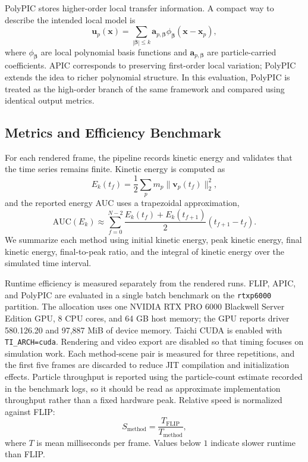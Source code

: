 \documentclass[conference]{IEEEtran}
\begin{document}
PolyPIC stores higher-order local transfer information. A compact way to describe the intended local model is
\begin{equation}
\mathbf{u}_p(\mathbf{x})
= \sum_{|\boldsymbol{\beta}|\le k}
\mathbf{a}_{p,\boldsymbol{\beta}}
\phi_{\boldsymbol{\beta}}(\mathbf{x}-\mathbf{x}_p),
\label{eq:polypic}
\end{equation}
where $\phi_{\boldsymbol{\beta}}$ are local polynomial basis functions and $\mathbf{a}_{p,\boldsymbol{\beta}}$ are particle-carried coefficients. APIC corresponds to preserving first-order local variation; PolyPIC extends the idea to richer polynomial structure. In this evaluation, PolyPIC is treated as the high-order branch of the same framework and compared using identical output metrics.

\subsection{Metrics and Efficiency Benchmark}

For each rendered frame, the pipeline records kinetic energy and validates that the time series remains finite. Kinetic energy is computed as
\begin{equation}
E_k(t_f)=\frac{1}{2}\sum_p m_p \|\mathbf{v}_p(t_f)\|_2^2,
\label{eq:energy}
\end{equation}
and the reported energy AUC uses a trapezoidal approximation,
\begin{equation}
\mathrm{AUC}(E_k)\approx
\sum_{f=0}^{N-2}
\frac{E_k(t_f)+E_k(t_{f+1})}{2}(t_{f+1}-t_f).
\label{eq:auc}
\end{equation}
We summarize each method using initial kinetic energy, peak kinetic energy, final kinetic energy, final-to-peak ratio, and the integral of kinetic energy over the simulated time interval.

Runtime efficiency is measured separately from the rendered runs. FLIP, APIC, and PolyPIC are evaluated in a single batch benchmark on the \texttt{rtxp6000} partition. The allocation uses one NVIDIA RTX PRO 6000 Blackwell Server Edition GPU, 8 CPU cores, and 64 GB host memory; the GPU reports driver 580.126.20 and 97,887 MiB of device memory. Taichi CUDA is enabled with \texttt{TI\_ARCH=cuda}. Rendering and video export are disabled so that timing focuses on simulation work. Each method-scene pair is measured for three repetitions, and the first five frames are discarded to reduce JIT compilation and initialization effects. Particle throughput is reported using the particle-count estimate recorded in the benchmark logs, so it should be read as approximate implementation throughput rather than a fixed hardware peak. Relative speed is normalized against FLIP:
\begin{equation}
S_{\mathrm{method}}=\frac{T_{\mathrm{FLIP}}}{T_{\mathrm{method}}},
\label{eq:speedup}
\end{equation}
where $T$ is mean milliseconds per frame. Values below $1$ indicate slower runtime than FLIP.
\end{document}
